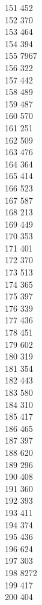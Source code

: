 { 151	452 \\
 152	370 \\
 153	464 \\
 154	394 \\
 155	7967 \\
 156	322 \\
 157	442 \\
 158	489 \\
 159	487 \\
 160	570 \\
 161	251 \\
 162	509 \\
 163	476 \\
 164	364 \\
 165	414 \\
 166	523 \\
 167	587 \\
 168	213 \\
 169	449 \\
 170	353 \\
 171	401 \\
 172	370 \\
 173	513 \\
 174	365 \\
 175	397 \\
 176	339 \\
 177	436 \\
 178	451 \\
 179	602 \\
 180	319 \\
 181	354 \\
 182	443 \\
 183	580 \\
 184	310 \\
 185	417 \\
 186	465 \\
 187	397 \\
 188	620 \\
 189	296 \\
 190	408 \\
 191	360 \\
 192	393 \\
 193	411 \\
 194	374 \\
 195	436 \\
 196	624 \\
 197	303 \\
 198	8272 \\
 199	417 \\
 200	404 \\
}
